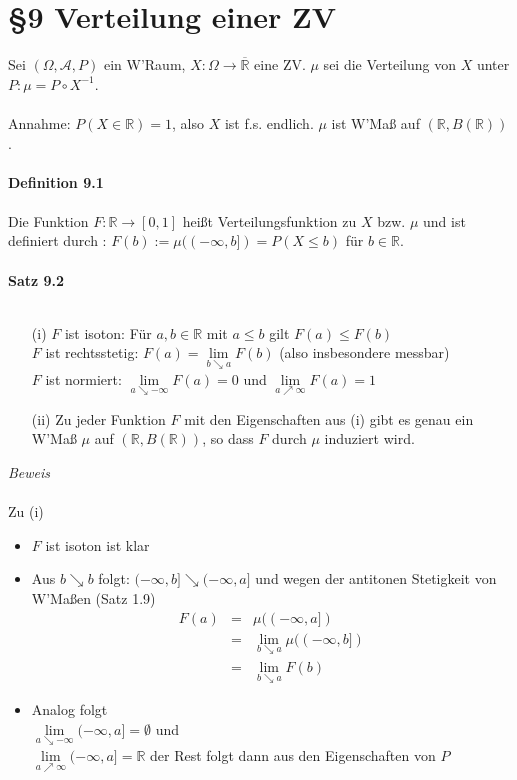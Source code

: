 \documentclass[10pt,a4paper]{report}
\newcommand{\R}{\mathbb{R}}
\numberwithin{equation}{section}
\numberwithin{figure}{section}
\theoremstyle{plain}
\theoremstyle{definition}
\theoremstyle{plain}
\theoremstyle{definition}
\theoremstyle{remark}
\theoremstyle{plain}
\begin{document}
\chapter*{\S 9 \qquad Verteilung einer ZV}
Sei $(\Omega,\mathcal{A},P)$ ein W'Raum, $X:\Omega \to \overline{\R}$ eine ZV. $\mu$ sei die Verteilung von $X$ unter $P: \mu=P\circ X^{-1}$.\\\\
Annahme: $P(X\in \R)=1$, also $X$ ist f.s. endlich. $\mu$ ist W'Maß auf $(\R,B(\R))$.\\\\
\textbf{Definition 9.1}\\\\
Die Funktion $F:\R \to [0,1]$ heißt Verteilungsfunktion zu $X$ bzw. $\mu$ und ist definiert durch : $F(b):=\mu((-\infty,b])=P(X\leq b)$ für $b \in \R$.\\\\
\textbf{Satz 9.2}\\\\
\begin{itemize}
\item[(i)] $F$ ist isoton: Für $a,b \in \R$ mit $a \leq b$ gilt $F(a)\leq F(b)$\\
$F$ ist rechtsstetig: $F(a)=\lim\limits_{b\searrow a}F(b)$ (also insbesondere messbar)\\
$F$ ist normiert: $\lim\limits_{a\searrow -\infty}F(a)=0$ und $\lim\limits_{a\nearrow \infty}F(a)=1$
\item[(ii)] Zu jeder Funktion $F$ mit den Eigenschaften aus (i) gibt es genau ein W'Maß $\mu$ auf $(\R,B(\R))$, so dass $F$ durch $\mu$ induziert wird. 
\end{itemize}
\textit{Beweis}\\\\
Zu (i)
\begin{itemize}
\item $F$ ist isoton ist klar
\item Aus $b \searrow b$ folgt: $(-\infty,b] \searrow (-\infty,a]$ und wegen der antitonen Stetigkeit von W'Maßen (Satz 1.9)
\begin{eqnarray*}
F(a)&=&\mu((-\infty,a])\\
&=& \lim\limits_{b\searrow a} \mu((-\infty,b]) \\
&=& \lim\limits_{b\searrow a} F(b)
\end{eqnarray*}
\item Analog folgt\\
$\lim\limits_{a\searrow -\infty} (-\infty,a]=\emptyset$ und\\
$\lim\limits_{a\nearrow \infty} (-\infty,a]=\R$ der Rest folgt dann aus den Eigenschaften von $P$
\end{itemize}
\end{document}
